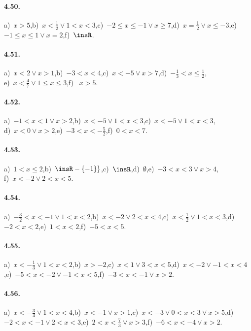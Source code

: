 \paragraph{4.50.} a)~$x>5$,\quad b)~$x<\frac{1}{2}\vee 1<x<3$,\quad c)~$-2\le x\le -1\vee x\ge 7$,\quad d)~$x=\frac{1}{2}\vee x\le -3$,\quad e)~$-1\le x\le 1 \vee x=2$,\quad f)~$\insR$.

\paragraph{4.51.} a)~$x<2\vee x>1$,\quad b)~$-3<x<4$,\quad c)~$x<-5\vee x>7$,\quad d)~$-\frac 1 3<x\le \frac 1 2$,\protect\\
e)~$x<\frac 4 7\vee 1\le x\le 3$,\quad f)~ $x>5$.

\paragraph{4.52.} a)~$-1<x<1\vee x>2$,\quad b)~$x<-5\vee 1<x<3$,\quad c)~$x<-5\vee 1<x<3$,\protect\\
d)~$x<0\vee x>2$,\quad e)~$-3<x<-\frac 5 2$,\quad f)~$0<x<7$.

\paragraph{4.53.} a)~$1< x\le 2$,\quad b)~$\insR-\{-1\}\}$,\quad c)~$\insR$,\quad d)~$\emptyset $,\quad e)~$-3<x<3\vee x>4$,\protect\\
f)~$x<-2\vee 2<x<5$.

\paragraph{4.54.} a)~$-\frac 3 2<x<-1\vee 1<x<2$,\quad b)~$x<-2\vee 2<x<4$,\quad c)~$x<\frac 1 2\vee 1<x<3$,\quad d)~$-2<x<2$,\quad e)~$1<x<2$,\quad f)~$-5<x<5$.

\paragraph{4.55.} a)~$x<-\frac 1 3\vee 1<x<2$,\quad b)~$x>-2$,\quad c)~$x<1\vee 3<x<5$,\quad d)~$x<-2\vee -1<x<4$,\quad e)~$-5<x<-2\vee -1<x<5$,\quad f)~$-3<x<-1\vee x>2$.

\paragraph{4.56.} a)~$x<-\frac 3 4\vee 1<x<4$,\quad b)~$x<-1\vee x>1$,\quad c)~$x<-3\vee 0<x<3\vee x>5$,\quad d)~$-2<x<-1\vee 2<x<3$,\quad e)~$2<x<\frac 7 3\vee x>3$,\quad f)~$-6<x<-4\vee x>2$.

